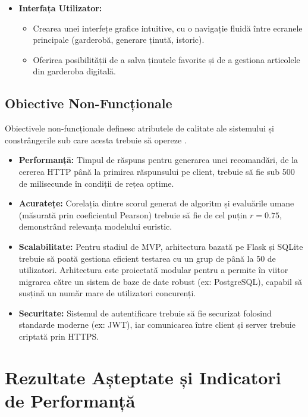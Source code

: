 \begin{itemize}
    \item \textbf{Interfața Utilizator:}
        \begin{itemize}
            \item Crearea unei interfețe grafice intuitive, cu o navigație fluidă între ecranele principale (garderobă, generare ținută, istoric).
            \item Oferirea posibilității de a salva ținutele favorite și de a gestiona articolele din garderoba digitală.
        \end{itemize}
\end{itemize}

\subsection{Obiective Non-Funcționale}

Obiectivele non-funcționale definesc atributele de calitate ale sistemului și constrângerile sub care acesta trebuie să opereze \cite{software_engineering_sommerville}.

\begin{itemize}
    \item \textbf{Performanță:} Timpul de răspuns pentru generarea unei recomandări, de la cererea HTTP până la primirea răspunsului pe client, trebuie să fie sub 500 de milisecunde în condiții de rețea optime.
    \item \textbf{Acuratețe:} Corelația dintre scorul generat de algoritm și evaluările umane (măsurată prin coeficientul Pearson) trebuie să fie de cel puțin $r = 0.75$, demonstrând relevanța modelului euristic.
    \item \textbf{Scalabilitate:} Pentru stadiul de MVP, arhitectura bazată pe Flask și SQLite trebuie să poată gestiona eficient testarea cu un grup de până la 50 de utilizatori. Arhitectura este proiectată modular pentru a permite în viitor migrarea către un sistem de baze de date robust (ex: PostgreSQL), capabil să susțină un număr mare de utilizatori concurenți.
    \item \textbf{Securitate:} Sistemul de autentificare trebuie să fie securizat folosind standarde moderne (ex: JWT), iar comunicarea între client și server trebuie criptată prin HTTPS.
\end{itemize}

\section{Rezultate Așteptate și Indicatori de Performanță}

